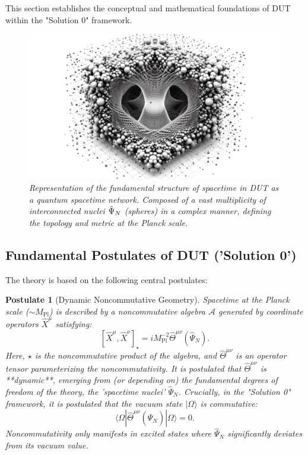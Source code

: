 \documentclass[11pt, a4paper]{article}
\newtheorem{postulate}{Postulate}
\theoremstyle{remark}
\newcommand{\Op}[1]{\hat{#1}}
\newcommand{\Mpl}{M_{\mathrm{Pl}}}
\begin{document}
This section establishes the conceptual and mathematical foundations of DUT within the "Solution 0" framework.

\begin{figure}[htbp]
    \centering
    \includegraphics[width=0.6\linewidth]{OIG9.ZNLJ.PNG}
    \caption{%
       \footnotesize\textit{Representation of the fundamental structure of spacetime in DUT as a quantum spacetime network. Composed of a vast multiplicity of interconnected nuclei \(\protect\Op{\Psi}_N\) (spheres) in a complex manner, defining the topology and metric at the Planck scale.}
    }
    \label{fig:Figura4}
\end{figure}

\subsection{Fundamental Postulates of DUT ('Solution 0')}
\label{subsec:postulates_final}

The theory is based on the following central postulates:

\begin{postulate}[Dynamic Noncommutative Geometry]
    \label{post:gnc_final}
    Spacetime at the Planck scale (\(\sim \Mpl\)) is described by a noncommutative algebra \( \mathcal{A} \) generated by coordinate operators \( \hat{X}^{\mu} \) satisfying:
    \begin{equation} \label{eq:conmutador_nc_final}
    [\hat{X}^{\mu}, \hat{X}^{\nu}]_{\star} = i\Mpl^{-2} \Op{\Theta}^{\mu\nu}(\Op{\Psi}_N).
    \end{equation}
    Here, \( \star \) is the noncommutative product of the algebra, and \( \Op{\Theta}^{\mu\nu} \) is an operator tensor parameterizing the noncommutativity. It is postulated that \( \Op{\Theta}^{\mu\nu} \) is **dynamic**, emerging from (or depending on) the fundamental degrees of freedom of the theory, the 'spacetime nuclei' \( \Op{\Psi}_N \). Crucially, in the "Solution 0" framework, it is postulated that the vacuum state \( |\Omega\rangle \) is commutative:
    \[ \langle\Omega| \Op{\Theta}^{\mu\nu}(\Op{\Psi}_N) |\Omega\rangle = 0. \]
    Noncommutativity only manifests in excited states where \( \Op{\Psi}_N \) significantly deviates from its vacuum value.
\end{postulate}
\end{document}
